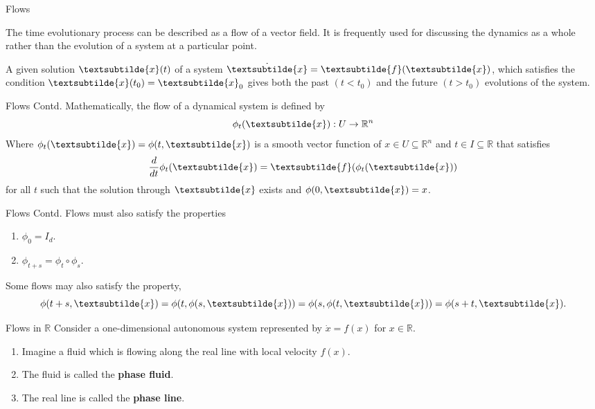 \documentclass[18pt]{beamer}
\begin{document}
\begin{frame}{Flows}
    \begin{definition}[Flow]
        The time evolutionary process can be described as a flow of a vector field.
        It is frequently used for discussing the dynamics as a whole rather than the evolution of a system at a particular point.
    \end{definition}

    A given solution $\textsubtilde{x}(t)$ of a system $\dot{\textsubtilde{x}} = \textsubtilde{f}(\textsubtilde{x})$, which satisfies the condition $\textsubtilde{x}(t_0) = \textsubtilde{x}_0$ gives both the past $(t < t_0)$ and the future $(t > t_0)$ evolutions of the system.
\end{frame}

\begin{frame}{Flows Contd.}
    Mathematically, the flow of a dynamical system is defined by
    \[\phi_t(\textsubtilde{x}): U \rightarrow \mathbb{R}^{n}\]
    \pause{}
    Where $\phi_t(\textsubtilde{x}) = \phi(t, \textsubtilde{x})$ is a smooth vector function of
    $x \in U \subseteq \mathbb{R}^{n}$ and $t \in I \subseteq \mathbb{R}$ that satisfies
    \[\frac{d}{dt}\phi_t (\textsubtilde{x}) = \textsubtilde{f}(\phi_t(\textsubtilde{x}))\]
    for all $t$ such that the solution through $\textsubtilde{x}$ exists and $\phi(0, \textsubtilde{x}) = x$.
\end{frame}

\begin{frame}{Flows Contd.}
    Flows must also satisfy the properties
    
    \begin{enumerate}
        \item $\phi_0 = I_d$.
        \item $\phi_{t+s} = \phi_t \circ \phi_s$.
    \end{enumerate}

    \pause{}

    Some flows may also satisfy the property,
    \[\phi(t+s , \textsubtilde{x}) = \phi(t , \phi(s , \textsubtilde{x})) = \phi(s, \phi(t, \textsubtilde{x})) = \phi(s + t, \textsubtilde{x})\text{.}\]
\end{frame}

\begin{frame}{Flows in $\mathbb{R}$}
    Consider a one-dimensional autonomous system represented by $\dot{x} = f(x)$ for $x \in \mathbb{R} \text{.}$
    \pause{}
    \begin{enumerate}
        \item Imagine a fluid which is flowing along the real line with local velocity $f(x)$.
        \item The fluid is called the \textbf{phase fluid}.
        \item The real line is called the \textbf{phase line}.
    \end{enumerate}
\end{frame}
\end{document}
